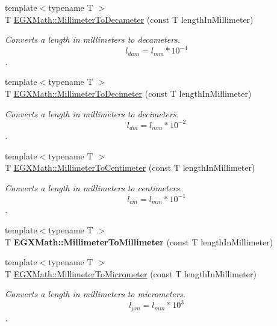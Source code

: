 \begin{DoxyCompactItemize}
{\footnotesize template$<$typename T $>$ }\\T \mbox{\hyperlink{group___e_g_x_math-_conversions-_length_conversions-_s_i-_millimeter-_s_i_gaf0e54830f6ae997dde95341e87638bf5}{E\+G\+X\+Math\+::\+Millimeter\+To\+Decameter}} (const T length\+In\+Millimeter)
\begin{DoxyCompactList}\small\item\em Converts a length in millimeters to decameters. \[ l_{dam}=l_{mm} * 10^{-4} \]. \end{DoxyCompactList}\item 
{\footnotesize template$<$typename T $>$ }\\T \mbox{\hyperlink{group___e_g_x_math-_conversions-_length_conversions-_s_i-_millimeter-_s_i_gad38e2be59f56a27e7628cfcbaa4a7df2}{E\+G\+X\+Math\+::\+Millimeter\+To\+Decimeter}} (const T length\+In\+Millimeter)
\begin{DoxyCompactList}\small\item\em Converts a length in millimeters to decimeters. \[ l_{dm}=l_{mm} * 10^{-2} \]. \end{DoxyCompactList}\item 
{\footnotesize template$<$typename T $>$ }\\T \mbox{\hyperlink{group___e_g_x_math-_conversions-_length_conversions-_s_i-_millimeter-_s_i_gaa77c48215c6c4f46394025af4cb26ead}{E\+G\+X\+Math\+::\+Millimeter\+To\+Centimeter}} (const T length\+In\+Millimeter)
\begin{DoxyCompactList}\small\item\em Converts a length in millimeters to centimeters. \[ l_{cm}=l_{mm} * 10^{-1} \]. \end{DoxyCompactList}\item 
\mbox{\label{_millimeter_conversion_8inl_a369bc419dd23961cccbf8327490b8542}} 
{\footnotesize template$<$typename T $>$ }\\T {\bfseries E\+G\+X\+Math\+::\+Millimeter\+To\+Millimeter} (const T length\+In\+Millimeter)
\item 
{\footnotesize template$<$typename T $>$ }\\T \mbox{\hyperlink{group___e_g_x_math-_conversions-_length_conversions-_s_i-_millimeter-_s_i_gadec5d89ecdd6bfe638f54ceffe0e0630}{E\+G\+X\+Math\+::\+Millimeter\+To\+Micrometer}} (const T length\+In\+Millimeter)
\begin{DoxyCompactList}\small\item\em Converts a length in millimeters to micrometers. \[ l_{\mu m}=l_{mm} * 10^{3} \]. \end{DoxyCompactList}\item 

\end{DoxyCompactItemize}
